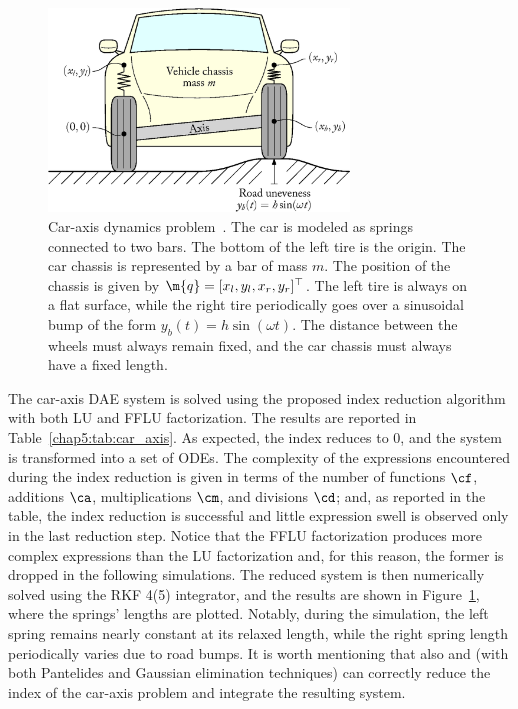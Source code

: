 \begin{figure}
  \centering
  \includegraphics[width=8cm]{figures/chapter_5/car_axis}
  \caption{Car-axis dynamics problem~\cite{lioen1998test, mazzia2008test}. The car is modeled as springs connected to two bars. The bottom of the left tire is the origin. The car chassis is represented by a bar of mass $m$. The position of the chassis is given by $\m{q} = [x_l, y_l, x_r, y_r]^\top$. The left tire is always on a flat surface, while the right tire periodically goes over a sinusoidal bump of the form $y_b(t) = h\sin(\omega t)$. The distance between the wheels must always remain fixed, and the car chassis must always have a fixed length.}
  \label{chap5:fig:car_axis}
\end{figure}

The car-axis \ac{DAE} system is solved using the proposed index reduction algorithm with both \ac{LU} and \ac{FFLU} factorization. The results are reported in Table~\ref{chap5:tab:car_axis}. As expected, the index reduces to 0, and the system is transformed into a set of \acp{ODE}. The complexity of the expressions encountered during the index reduction is given in terms of the number of functions $\cf$, additions $\ca$, multiplications $\cm$, and divisions $\cd$; and, as reported in the table, the index reduction is successful and little expression swell is observed only in the last reduction step. Notice that the \ac{FFLU} factorization produces more complex expressions than the \ac{LU} factorization and, for this reason, the former is dropped in the following simulations. The reduced system is then numerically solved using the \ac{RKF} 4(5) integrator, and the results are shown in Figure~\ref{chap5:fig:car_axis}, where the springs' lengths are plotted. Notably, during the simulation, the left spring remains nearly constant at its relaxed length, while the right spring length periodically varies due to road bumps. It is worth mentioning that also \Mathematica{} and \Matlab{} (with both Pantelides and Gaussian elimination techniques) can correctly reduce the index of the car-axis problem and integrate the resulting system.


